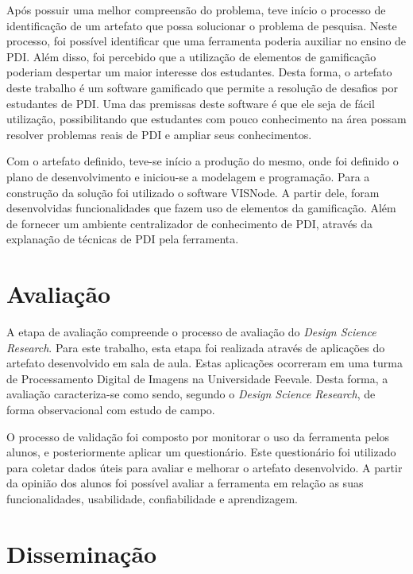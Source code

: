\documentclass[
	12pt,				%
	oneside,			%
	a4paper,			%
	english,			%
	french,				%
	spanish,			%
	brazil,				%
	]{abntex2}
\begin{document}
Após possuir uma melhor compreensão do problema, teve início o processo de identificação de um artefato que possa solucionar o problema de pesquisa. Neste processo, foi possível identificar que uma ferramenta poderia auxiliar no ensino de PDI. Além disso, foi percebido que a utilização de elementos de gamificação poderiam despertar um maior interesse dos estudantes. Desta forma, o artefato deste trabalho é um software gamificado que permite a resolução de desafios por estudantes de PDI. Uma das premissas deste software é que ele seja de fácil utilização, possibilitando que estudantes com pouco conhecimento na área possam resolver problemas reais de PDI e ampliar seus conhecimentos.

Com o artefato definido, teve-se início a produção do mesmo, onde foi definido o plano de desenvolvimento e iniciou-se a modelagem e programação. Para a construção da solução foi utilizado o software VISNode. A partir dele, foram desenvolvidas funcionalidades que fazem uso de elementos da gamificação. Além de fornecer um ambiente centralizador de conhecimento de PDI, através da explanação de técnicas de PDI pela ferramenta.

\section{Avaliação}

A etapa de avaliação compreende o processo de avaliação do \textit{Design Science Research}. Para este trabalho, esta etapa foi realizada através de aplicações do artefato desenvolvido em sala de aula. Estas aplicações ocorreram em uma turma de Processamento Digital de Imagens na Universidade Feevale. Desta forma, a avaliação caracteriza-se como sendo, segundo o \textit{Design Science Research}, de forma observacional com estudo de campo.

O processo de validação foi composto por monitorar o uso da ferramenta pelos alunos, e posteriormente aplicar um questionário. Este questionário foi utilizado para coletar dados úteis para avaliar e melhorar o artefato desenvolvido. A partir da opinião dos alunos foi possível avaliar a ferramenta em relação as suas funcionalidades, usabilidade, confiabilidade e aprendizagem.

\section{Disseminação}
\end{document}
